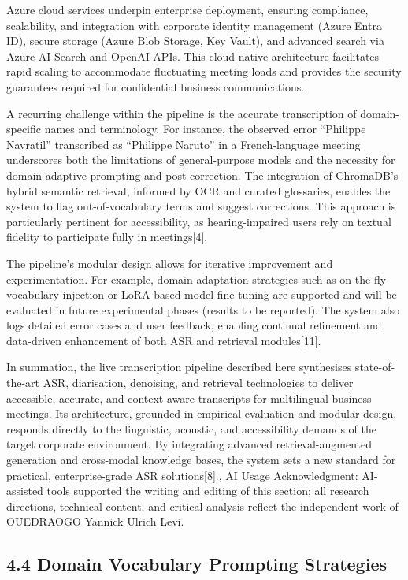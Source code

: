\documentclass[12pt,a4paper]{article}
\begin{document}
Azure cloud services underpin enterprise deployment, ensuring compliance, scalability, and integration with corporate identity management (Azure Entra ID), secure storage (Azure Blob Storage, Key Vault), and advanced search via Azure AI Search and OpenAI APIs. This cloud-native architecture facilitates rapid scaling to accommodate fluctuating meeting loads and provides the security guarantees required for confidential business communications.


A recurring challenge within the pipeline is the accurate transcription of domain-specific names and terminology. For instance, the observed error “Philippe Navratil” transcribed as “Philippe Naruto” in a French-language meeting underscores both the limitations of general-purpose models and the necessity for domain-adaptive prompting and post-correction. The integration of ChromaDB’s hybrid semantic retrieval, informed by OCR and curated glossaries, enables the system to flag out-of-vocabulary terms and suggest corrections. This approach is particularly pertinent for accessibility, as hearing-impaired users rely on textual fidelity to participate fully in meetings[4].


The pipeline’s modular design allows for iterative improvement and experimentation. For example, domain adaptation strategies such as on-the-fly vocabulary injection or LoRA-based model fine-tuning are supported and will be evaluated in future experimental phases (results to be reported). The system also logs detailed error cases and user feedback, enabling continual refinement and data-driven enhancement of both ASR and retrieval modules[11].


In summation, the live transcription pipeline described here synthesises state-of-the-art ASR, diarisation, denoising, and retrieval technologies to deliver accessible, accurate, and context-aware transcripts for multilingual business meetings. Its architecture, grounded in empirical evaluation and modular design, responds directly to the linguistic, acoustic, and accessibility demands of the target corporate environment. By integrating advanced retrieval-augmented generation and cross-modal knowledge bases, the system sets a new standard for practical, enterprise-grade ASR solutions[8]., AI Usage Acknowledgment: AI-assisted tools supported the writing and editing of this section; all research directions, technical content, and critical analysis reflect the independent work of OUEDRAOGO Yannick Ulrich Levi.


\subsection{4.4 Domain Vocabulary Prompting Strategies}
\end{document}
